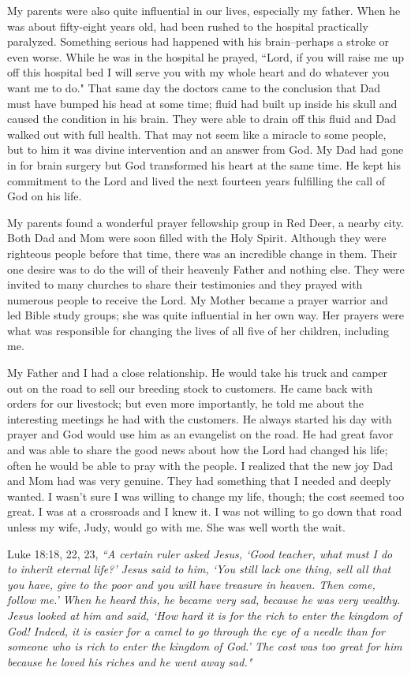 \documentclass[oneside]{book}
\begin{document}
My parents were also quite influential in our lives, especially my father. When he was about fifty-eight years old, had been rushed to the hospital practically paralyzed. Something serious had happened with his brain--perhaps a stroke or even worse. While he was in the hospital he prayed, ``Lord, if you will raise me up off this hospital bed I will serve you with my whole heart and do whatever you want me to do." That same day the doctors came to the conclusion that Dad must have bumped his head at some time; fluid had built up inside his skull and caused the condition in his brain. They were able to drain off this fluid and Dad walked out with full health. That may not seem like a miracle to some people, but to him it was divine intervention and an answer from God. My Dad had gone in for brain surgery but God transformed his heart at the same time. He kept his commitment to the Lord and lived the next fourteen years fulfilling the call of God on his life.

My parents found a wonderful prayer fellowship group in Red Deer, a nearby city. Both Dad and Mom were soon filled with the Holy Spirit. Although they were righteous people before that time, there was an incredible change in them. Their one desire was to do the will of their heavenly Father and nothing else. They were invited to many churches to share their testimonies and they prayed with numerous people to receive the Lord. My Mother became a prayer warrior and led Bible study groups; she was quite influential in her own way. Her prayers were what was responsible for changing the lives of all five of her children, including me.

My Father and I had a close relationship. He would take his truck and camper out on the road to sell our breeding stock to customers. He came back with orders for our livestock; but even more importantly, he told me about the interesting meetings he had with the customers. He always started his day with prayer and God would use him as an evangelist on the road. He had great favor and was able to share the good news about how the Lord had changed his life; often he would be able to pray with the people. I realized that the new joy Dad and Mom had was very genuine. They had something that I needed and deeply wanted. I wasn't sure I was willing to change my life, though; the cost seemed too great. I was at a crossroads and I knew it. I was not willing to go down that road unless my wife, Judy, would go with me. She was well worth the wait.

Luke 18:18, 22, 23,  \textit{``A certain ruler asked Jesus, `Good teacher, what must I do to inherit eternal life?' Jesus said to him, `You still lack one thing, sell all that you have, give to the poor and you will have treasure in heaven. Then come, follow me.' When he heard this, he became very sad, because he was very wealthy. Jesus looked at him and said, `How hard it is for the rich to enter the kingdom of God! Indeed, it is easier for a camel to go through the eye of a needle than for someone who is rich to enter the kingdom of God.' The cost was too great for him because he loved his riches and he went away sad."}
\end{document}
